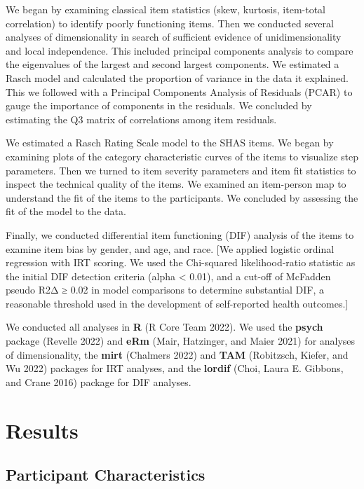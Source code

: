 \documentclass[
  letterpaper,
  DIV=11,
  numbers=noendperiod]{scrreport}
\begin{document}
We began by examining classical item statistics (skew, kurtosis,
item-total correlation) to identify poorly functioning items. Then we
conducted several analyses of dimensionality in search of sufficient
evidence of unidimensionality and local independence. This included
principal components analysis to compare the eigenvalues of the largest
and second largest components. We estimated a Rasch model and calculated
the proportion of variance in the data it explained. This we followed
with a Principal Components Analysis of Residuals (PCAR) to gauge the
importance of components in the residuals. We concluded by estimating
the Q3 matrix of correlations among item residuals.

We estimated a Rasch Rating Scale model to the SHAS items. We began by
examining plots of the category characteristic curves of the items to
visualize step parameters. Then we turned to item severity parameters
and item fit statistics to inspect the technical quality of the items.
We examined an item-person map to understand the fit of the items to the
participants. We concluded by assessing the fit of the model to the
data.

Finally, we conducted differential item functioning (DIF) analysis of
the items to examine item bias by gender, and age, and race. {[}We
applied logistic ordinal regression with IRT scoring. We used the
Chi-squared likelihood-ratio statistic as the initial DIF detection
criteria (alpha \textless{} 0.01), and a cut-off of McFadden pseudo R2Δ
≥ 0.02 in model comparisons to determine substantial DIF, a reasonable
threshold used in the development of self-reported health outcomes.{]}

We conducted all analyses in \textbf{R} (R Core Team 2022). We used the
\textbf{psych} package (Revelle 2022) and \textbf{eRm} (Mair, Hatzinger,
and Maier 2021) for analyses of dimensionality, the \textbf{mirt}
(Chalmers 2022) and \textbf{TAM} (Robitzsch, Kiefer, and Wu 2022)
packages for IRT analyses, and the \textbf{lordif} (Choi, Laura E.
Gibbons, and Crane 2016) package for DIF analyses.


\hypertarget{results}{%
\chapter*{Results}\label{results}}

\hypertarget{participant-characteristics}{%
\section*{Participant
Characteristics}\label{participant-characteristics}}
\end{document}
